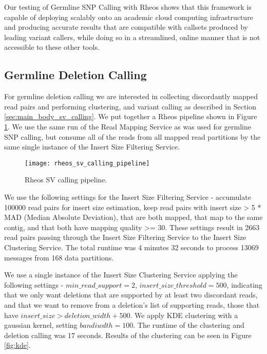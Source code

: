 Our testing of Germline SNP Calling with Rheos shows that this framework is capable of deploying scalably onto an academic cloud computing infrastructure and producing accurate results that are compatible with callsets produced by leading variant callers, while doing so in a streamlined, online manner that is not accessible to these other tools.

\subsection{Germline Deletion Calling}

For germline deletion calling we are interested in collecting discordantly mapped read pairs and performing clustering, and variant calling as described in Section \ref{sec:main_body_sv_calling}. We put together a Rheos pipeline shown in Figure \ref{fig:rheos_sv_calling_pipeline}. We use the same run of the Read Mapping Service as was used for germline SNP calling, but consume all of the reads from all mapped read partitions by the same single instance of the Insert Size Filtering Service.

\begin{figure}[h!]
    \texttt{[image: rheos\_sv\_calling\_pipeline]}
    \centering
    \caption {Rheos SV calling pipeline.}
    \label{fig:rheos_sv_calling_pipeline}
\end{figure}
\newpage
We use the following settings for the Insert Size Filtering Service - accumulate 100000 read pairs for insert size estimation, keep read pairs with insert size > 5 * MAD (Median Absolute Deviation), that are both mapped, that map to the same contig, and that both have mapping quality >= 30. These settings result in 2663 read pairs passing through the Insert Size Filtering Service to the Insert Size Clustering Service. The total runtime was 4 minutes 32 seconds to process 13069 messages from 168 data partitions.

We use a single instance of the Insert Size Clustering Service applying the following settings - $min\_read\_support = 2$, $insert\_size\_threshold = 500$, indicating that we only want deletions that are supported by at least two discordant reads, and that we want to remove from a deletion's list of supporting reads, those that have $insert\_size > deletion\_width + 500$. We apply KDE clustering with a gaussian kernel, setting $bandiwdth = 100$. The runtime of the clustering and deletion calling was 17 seconds. Results of the clustering can be seen in Figure \ref{fig:kde}.

